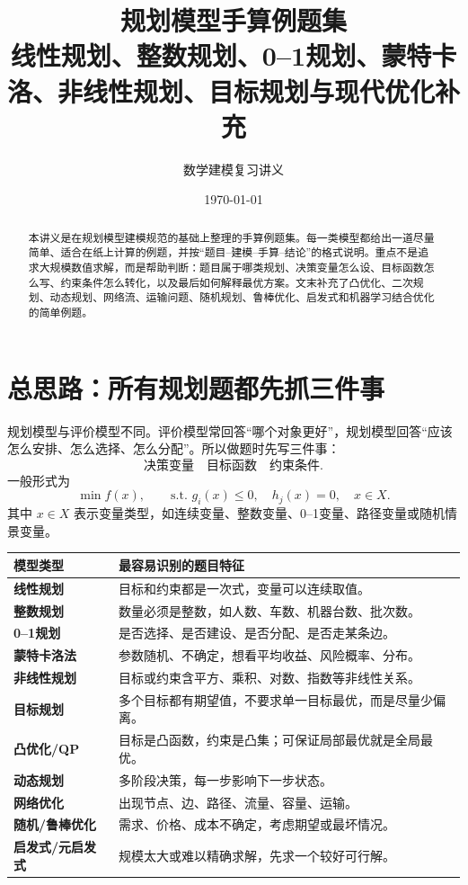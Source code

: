 \documentclass[UTF8,12pt,a4paper]{ctexart}
\title{\heiti 规划模型手算例题集\\\large 线性规划、整数规划、0--1规划、蒙特卡洛、非线性规划、目标规划与现代优化补充}
\author{数学建模复习讲义}
\date{\today}
\begin{document}
\maketitle

\begin{abstract}
本讲义是在规划模型建模规范的基础上整理的手算例题集。每一类模型都给出一道尽量简单、适合在纸上计算的例题，并按“题目--建模--手算--结论”的格式说明。重点不是追求大规模数值求解，而是帮助判断：题目属于哪类规划、决策变量怎么设、目标函数怎么写、约束条件怎么转化，以及最后如何解释最优方案。文末补充了凸优化、二次规划、动态规划、网络流、运输问题、随机规划、鲁棒优化、启发式和机器学习结合优化的简单例题。
\end{abstract}

\tableofcontents
\newpage

\section{总思路：所有规划题都先抓三件事}
规划模型与评价模型不同。评价模型常回答“哪个对象更好”，规划模型回答“应该怎么安排、怎么选择、怎么分配”。所以做题时先写三件事：
\[
\boxed{\text{决策变量}}\quad \boxed{\text{目标函数}}\quad \boxed{\text{约束条件}}.
\]
一般形式为
\[
\min f(x),\qquad \text{s.t. } g_i(x)\le 0,
\quad h_j(x)=0,\quad x\in X.
\]
其中 $x\in X$ 表示变量类型，如连续变量、整数变量、0--1变量、路径变量或随机情景变量。

\begin{center}
\begin{tabularx}{\textwidth}{>{\bfseries}p{3.4cm}X}
\toprule
模型类型 & 最容易识别的题目特征\\
\midrule
线性规划 & 目标和约束都是一次式，变量可以连续取值。\\
整数规划 & 数量必须是整数，如人数、车数、机器台数、批次数。\\
0--1规划 & 是否选择、是否建设、是否分配、是否走某条边。\\
蒙特卡洛法 & 参数随机、不确定，想看平均收益、风险概率、分布。\\
非线性规划 & 目标或约束含平方、乘积、对数、指数等非线性关系。\\
目标规划 & 多个目标都有期望值，不要求单一目标最优，而是尽量少偏离。\\
凸优化/QP & 目标是凸函数，约束是凸集；可保证局部最优就是全局最优。\\
动态规划 & 多阶段决策，每一步影响下一步状态。\\
网络优化 & 出现节点、边、路径、流量、容量、运输。\\
随机/鲁棒优化 & 需求、价格、成本不确定，考虑期望或最坏情况。\\
启发式/元启发式 & 规模太大或难以精确求解，先求一个较好可行解。\\
\bottomrule
\end{tabularx}
\end{center}
\end{document}
